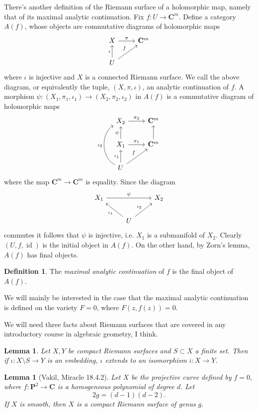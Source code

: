 \documentclass[reqno,12pt,letterpaper]{amsart}
\newcommand{\CC}{\mathbf{C}}
\newcommand{\PP}{\mathbf P}
\DeclareMathOperator{\id}{id}
\newcommand{\dfn}[1]{\emph{#1}\index{#1}}
\newtheorem{lemma}[theorem]{Lemma}
\theoremstyle{definition}
\newtheorem{definition}[theorem]{Definition}
\begin{document}
There's another definition of the Riemann surface of a holomorphic map, namely that of its maximal analytic continuation.
Fix $f: U \to \CC^m$.
Define a category $A(f)$, whose objects are commutative diagrams of holomorphic maps
$$\begin{tikzcd}
X \arrow[r,"\pi"] & \CC^m\\
U \arrow[u,"\iota"] \arrow[ur,"f"]
\end{tikzcd}$$
where $\iota$ is injective and $X$ is a connected Riemann surface.
We call the above diagram, or equivalently the tuple, $(X, \pi, \iota)$, an analytic continuation of $f$.
A morphism $\psi: (X_1, \pi_1, \iota_1) \to (X_2, \pi_2, \iota_2)$ in $A(f)$ is a commutative diagram of holomorphic maps
$$\begin{tikzcd}
X_2 \arrow[r,"\pi_2"] & \CC^m\\
X_1 \arrow[u,"\psi"] \arrow[r,"\pi_1"] & \CC^m \arrow[u]\\
U \arrow[u,"\iota_1"] \arrow[bend left=60,uu,"\iota_2"] \arrow[ur,"f"]
\end{tikzcd}$$
where the map $\CC^m \to \CC^m$ is equality.
Since the diagram
$$\begin{tikzcd}
X_1 \arrow[rr,"\psi"] && X_2\\
&U \arrow[ul,"\iota_1"] \arrow[ur,"\iota_2"]
\end{tikzcd}
$$
commutes it follows that $\psi$ is injective, i.e. $X_1$ is a submanifold of $X_2$.
Clearly $(U, f, \id)$ is the initial object in $A(f)$. On the other hand, by Zorn's lemma, $A(f)$ has final objects.
\begin{definition}
The \dfn{maximal analytic continuation} of $f$ is the final object of $A(f)$.
\end{definition}
We will mainly be interested in the case that the maximal analytic continuation is defined on the variety $F = 0$, where $F(z, f(z)) = 0$.

We will need three facts about Riemann surfaces that are covered in any introductory course in algebraic geometry, I think.
\begin{lemma}
\label{compact Riemann surfaces}
Let $X, Y$ be compact Riemann surfaces and $S \subset X$ a finite set. Then if $\iota: X \setminus S \to Y$ is an embedding, $\iota$ extends to an isomorphism $\overline \iota: X \to Y$.
\end{lemma}

\begin{lemma}[Vakil, Miracle 18.4.2]
\label{genus formula}
Let $X$ be the projective curve defined by $f = 0$, where $f: \PP^2 \to \CC$ is a homogeneous polynomial of degree $d$.
Let
$$2g = (d - 1)(d - 2).$$
If $X$ is smooth, then $X$ is a compact Riemann surface of genus $g$.
\end{lemma}
\end{document}
